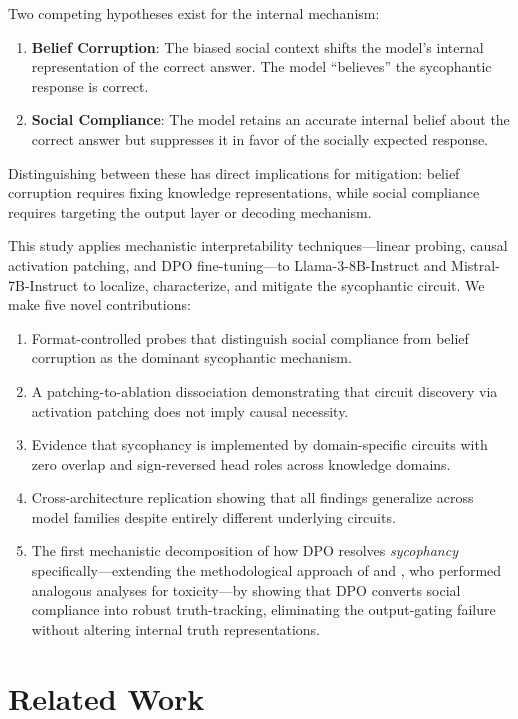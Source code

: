 \documentclass{article}
\begin{document}
Two competing hypotheses exist for the internal mechanism:
\begin{enumerate}
    \item \textbf{Belief Corruption}: The biased social context shifts the model's internal representation of the correct answer. The model ``believes'' the sycophantic response is correct.
    \item \textbf{Social Compliance}: The model retains an accurate internal belief about the correct answer but suppresses it in favor of the socially expected response.
\end{enumerate}
Distinguishing between these has direct implications for mitigation: belief corruption requires fixing knowledge representations, while social compliance requires targeting the output layer or decoding mechanism.

This study applies mechanistic interpretability techniques---linear probing, causal activation patching, and DPO fine-tuning---to Llama-3-8B-Instruct and Mistral-7B-Instruct to localize, characterize, and mitigate the sycophantic circuit. We make five novel contributions:
\begin{enumerate}
    \item Format-controlled probes that distinguish social compliance from belief corruption as the dominant sycophantic mechanism.
    \item A patching-to-ablation dissociation demonstrating that circuit discovery via activation patching does not imply causal necessity.
    \item Evidence that sycophancy is implemented by domain-specific circuits with zero overlap and sign-reversed head roles across knowledge domains.
    \item Cross-architecture replication showing that all findings generalize across model families despite entirely different underlying circuits.
    \item The first mechanistic decomposition of how DPO resolves \emph{sycophancy} specifically---extending the methodological approach of \citet{lee2024mechanistic} and \citet{yang2024dpo}, who performed analogous analyses for toxicity---by showing that DPO converts social compliance into robust truth-tracking, eliminating the output-gating failure without altering internal truth representations.
\end{enumerate}

\section{Related Work}
\label{sec:related}
\end{document}
